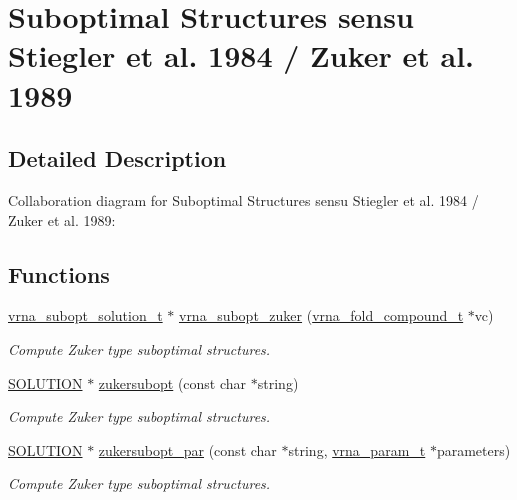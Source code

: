 \hypertarget{group__subopt__zuker}{}\section{Suboptimal Structures sensu Stiegler et al. 1984 / Zuker et al. 1989}
\label{group__subopt__zuker}


\subsection{Detailed Description}
Collaboration diagram for Suboptimal Structures sensu Stiegler et al. 1984 / Zuker et al. 1989\+:
\subsection*{Functions}
\begin{DoxyCompactItemize}
\item 
\mbox{\hyperlink{subopt_8h_a01ae9a0f27d245d89f705afd843fc457}{vrna\+\_\+subopt\+\_\+solution\+\_\+t}} $\ast$ \mbox{\hyperlink{group__subopt__zuker_gababde9d210eb433854f1e71da7815fbb}{vrna\+\_\+subopt\+\_\+zuker}} (\mbox{\hyperlink{group__fold__compound_ga1b0cef17fd40466cef5968eaeeff6166}{vrna\+\_\+fold\+\_\+compound\+\_\+t}} $\ast$vc)
\begin{DoxyCompactList}\small\item\em Compute Zuker type suboptimal structures. \end{DoxyCompactList}\item 
\mbox{\hyperlink{subopt_8h_aa0f46ff02e1017469cf902d02ecd7f9a}{S\+O\+L\+U\+T\+I\+ON}} $\ast$ \mbox{\hyperlink{group__subopt__zuker_ga0d5104e3ecf119d8eabd40aa5fe47f90}{zukersubopt}} (const char $\ast$string)
\begin{DoxyCompactList}\small\item\em Compute Zuker type suboptimal structures. \end{DoxyCompactList}\item 
\mbox{\hyperlink{subopt_8h_aa0f46ff02e1017469cf902d02ecd7f9a}{S\+O\+L\+U\+T\+I\+ON}} $\ast$ \mbox{\hyperlink{group__subopt__zuker_gab6d0ea8cc1d02f6dd831ca81043c9eb8}{zukersubopt\+\_\+par}} (const char $\ast$string, \mbox{\hyperlink{group__energy__parameters_ga8a69ca7d787e4fd6079914f5343a1f35}{vrna\+\_\+param\+\_\+t}} $\ast$parameters)
\begin{DoxyCompactList}\small\item\em Compute Zuker type suboptimal structures. \end{DoxyCompactList}\end{DoxyCompactItemize}


